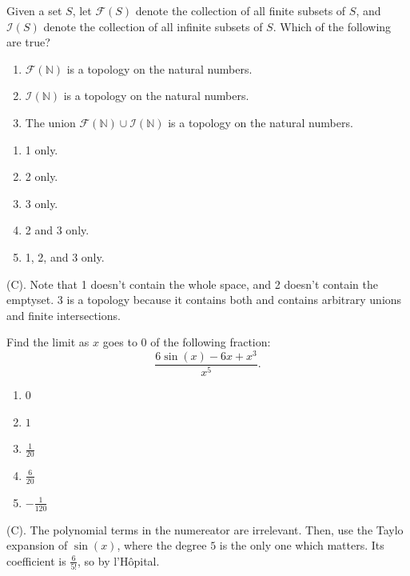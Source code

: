 \begin{exercise}
Given a set $S$, let $\mathcal{F}(S)$ denote the collection of all finite
subsets of $S$, and $\mathcal{I}(S)$ denote the collection of all infinite
subsets of $S$. Which of the following are true?
\begin{enumerate}
    \item $\mathcal{F}(\mathbb{N})$ is a topology on the natural numbers.
    \item $\mathcal{I}(\mathbb{N})$ is a topology on the natural numbers.
    \item The union $\mathcal{F}(\mathbb{N})\cup\mathcal{I}(\mathbb{N})$
    is a topology on the natural numbers.
\end{enumerate}
\begin{enumerate}[label=(\Alph*)]
    \item 1 only.
    \item 2 only.
    \item 3 only.
    \item 2 and 3 only.
    \item 1, 2, and 3 only.
\end{enumerate}
\end{exercise}
\begin{solution}
(C). Note that 1 doesn't contain the whole space, and 2 doesn't contain 
the emptyset. 3 is a topology because it contains both and contains 
arbitrary unions and finite intersections.
\end{solution}

\begin{exercise}
Find the limit as $x$ goes to $0$ of the following fraction:
\[
\frac{6\sin(x)-6x+x^3}{x^5}.
\]
\begin{enumerate}[label=(\alph*)]
    \item $0$
    \item $1$
    \item $\frac{1}{20}$
    \item $\frac{6}{20}$
    \item $-\frac{1}{120}$
\end{enumerate}
\end{exercise}
\begin{solution}
(C). The polynomial terms in the numereator are irrelevant.
Then, use the Taylo expansion of $\sin(x)$, where the degree $5$ is 
the only one which matters. Its coefficient is $\frac{6}{5!}$, so by 
l'H\^{o}pital.
\end{solution}

